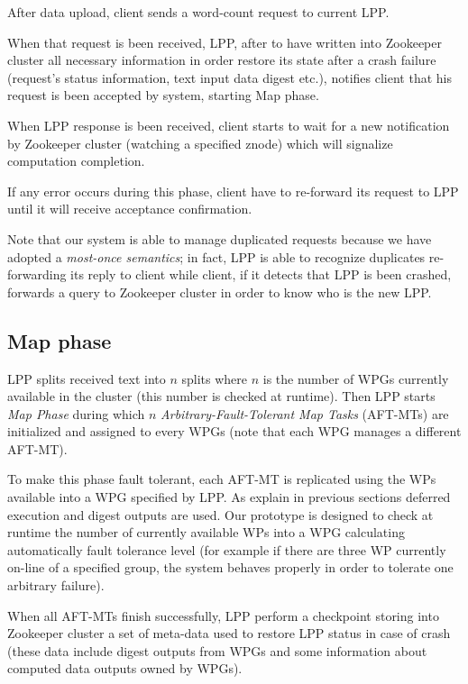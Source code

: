 \documentclass[sigchi]{acmart}
\begin{document}
After data upload, client sends a word-count request to current LPP. 

When that request is been received, LPP, after to have written into Zookeeper cluster all necessary information  in order restore its state after a crash failure (request's status information, text input data digest etc.),  notifies client that his request is been accepted by system, starting Map phase.

When LPP response is been received, client starts to wait for a new notification by Zookeeper cluster (watching a specified znode) which will signalize computation completion.

If any error occurs during this phase, client have to re-forward its request to LPP until it will receive acceptance confirmation. 

Note that our system is able to manage duplicated requests because we have adopted a \textit{most-once semantics}; in fact, LPP is able to recognize duplicates re-forwarding its reply to client while client, if it detects that LPP is been crashed, forwards a query to Zookeeper cluster in order to know who is the new LPP.

\subsection{Map phase}

LPP splits received text into $n$ splits where $n$ is the number of WPGs currently available in the cluster (this number is checked at runtime). Then LPP starts \textit{Map Phase} during which $n$ \textit{Arbitrary-Fault-Tolerant Map Tasks} (AFT-MTs) are initialized and assigned to every WPGs (note that each WPG manages a different AFT-MT). 

To make this phase fault tolerant, each AFT-MT is replicated using the WPs available into a WPG specified by LPP. As explain in previous sections deferred execution and digest outputs are used. Our prototype is designed to check at runtime the number of currently available WPs into a WPG calculating automatically fault tolerance level (for example if there are three WP currently on-line of a specified group, the system behaves properly in order to tolerate one arbitrary failure).

When all AFT-MTs finish successfully, LPP perform a checkpoint storing into Zookeeper cluster a set of meta-data used to restore LPP status in case of crash (these data include digest outputs from WPGs and some information about computed data outputs owned by WPGs). 
\end{document}
